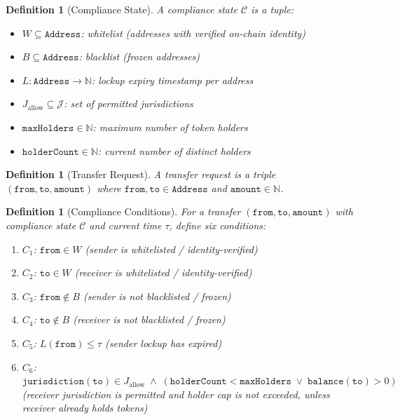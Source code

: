 \documentclass[11pt]{article}
\newtheorem{definition}[theorem]{Definition}
\begin{document}
\begin{definition}[Compliance State]
A compliance state $\mathcal{C}$ is a tuple:
\begin{itemize}
  \item $W \subseteq \texttt{Address}$: whitelist (addresses with verified on-chain identity)
  \item $B \subseteq \texttt{Address}$: blacklist (frozen addresses)
  \item $L : \texttt{Address} \to \mathbb{N}$: lockup expiry timestamp per address
  \item $J_{\text{allow}} \subseteq \mathcal{J}$: set of permitted jurisdictions
  \item $\texttt{maxHolders} \in \mathbb{N}$: maximum number of token holders
  \item $\texttt{holderCount} \in \mathbb{N}$: current number of distinct holders
\end{itemize}
\end{definition}

\begin{definition}[Transfer Request]
A transfer request is a triple $(\texttt{from}, \texttt{to}, \texttt{amount})$ where $\texttt{from}, \texttt{to} \in \texttt{Address}$ and $\texttt{amount} \in \mathbb{N}$.
\end{definition}

\begin{definition}[Compliance Conditions]
For a transfer $(\texttt{from}, \texttt{to}, \texttt{amount})$ with compliance state $\mathcal{C}$ and current time $\tau$, define six conditions:
\begin{enumerate}
  \item $C_1$: $\texttt{from} \in W$ (sender is whitelisted / identity-verified)
  \item $C_2$: $\texttt{to} \in W$ (receiver is whitelisted / identity-verified)
  \item $C_3$: $\texttt{from} \notin B$ (sender is not blacklisted / frozen)
  \item $C_4$: $\texttt{to} \notin B$ (receiver is not blacklisted / frozen)
  \item $C_5$: $L(\texttt{from}) \leq \tau$ (sender lockup has expired)
  \item $C_6$: $\texttt{jurisdiction}(\texttt{to}) \in J_{\text{allow}} \;\wedge\; (\texttt{holderCount} < \texttt{maxHolders} \;\vee\; \texttt{balance}(\texttt{to}) > 0)$ (receiver jurisdiction is permitted and holder cap is not exceeded, unless receiver already holds tokens)
\end{enumerate}
\end{definition}
\end{document}
